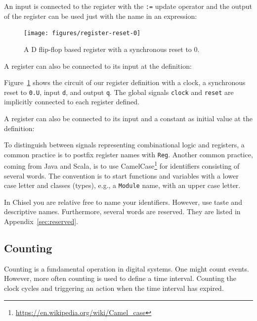 \documentclass[%
    10pt,
    headinclude, footexclude,
    openright, %
    notitlepage,
    cleardoubleempty,
    headsepline,
    pointlessnumbers,
    bibtotoc, idxtotoc,
    ]{scrbook}
\newcommand{\code}[1]{{\lstinline[basicstyle=\small\ttfamily]{#1}}}
\newcommand{\myref}[2]{\href{#1}{#2}}
\renewcommand{\myref}[2]{{#2}{\footnote{\url{#1}}}}
\begin{document}

\noindent An input is connected to the register with the \code{:=} update operator and
the output of the register can be used just with the name in an expression:


\begin{figure}
  \centering
  \texttt{[image: figures/register-reset-0]}
  \caption{A D flip-flop based register with a synchronous reset to 0.}
  \label{fig:register-reset-0}
\end{figure}

\noindent A register can also be connected to its input at the definition:


Figure~\ref{fig:register-reset-0} shows the circuit of our register definition with
a clock, a synchronous reset to \code{0.U}, input \code{d}, and output \code{q}.
The global signals \code{clock} and \code{reset} are implicitly connected to
each register defined.

\noindent A register can also be connected to its input and a constant as
initial value at the definition:


\noindent To distinguish between signals representing combinational logic and registers,
a common practice is to postfix register names with \code{Reg}.
Another common practice, coming from Java and Scala, is to use
\myref{https://en.wikipedia.org/wiki/Camel_case}{CamelCase} for
identifiers consisting of several words. The convention is to start
functions and variables with a lower case letter and classes (types),
e.g., a \code{Module} name, with an upper case letter.

In Chisel you are relative free to name your identifiers. However, use taste and
descriptive names. Furthermore, several words are reserved. They are listed
in Appendix~\ref{sec:reserved}.




\subsection{Counting}

Counting is a fundamental operation in digital systems. One might count events.
However, more often counting is used to define a time interval. Counting the
clock cycles and triggering an action when the time interval has expired.
\end{document}
